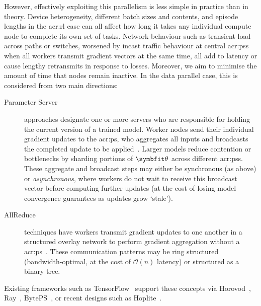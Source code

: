However, effectively exploiting this parallelism is less simple in practice than in theory.
Device heterogeneity, different batch sizes and contents, and episode lengths in the \gls{acr:rl} case can all affect how long it takes any individual compute node to complete its own set of tasks.
Network behaviour such as transient load across paths or switches, worsened by incast traffic behaviour at central \glspl{acr:ps} when all workers transmit gradient vectors at the same time, all add to latency or cause lengthy retransmits in response to losses.
Moreover, we aim to minimise the amount of time that nodes remain inactive.
In the data parallel case, this is considered from two main directions:
\begin{description}
	\item[Parameter Server] approaches designate one or more servers who are responsible for holding the current version of a trained model.
	Worker nodes send their individual gradient updates to the \gls{acr:ps}, who aggregates all inputs and broadcasts the completed update to be applied~\parencite{DBLP:conf/nips/DeanCMCDLMRSTYN12,DBLP:conf/osdi/LiAPSAJLSS14}.
	Larger models reduce contention or bottlenecks by sharding portions of $\wvec{}$ across different \glspl{acr:ps}.
	These aggregate and broadcast steps may either be synchronous (as above) or \emph{asynchronous}, where workers do not wait to receive this broadcast vector before computing further updates (at the cost of losing model convergence guarantees as updates grow `stale').
	
	\item[AllReduce] techniques have workers transmit gradient updates to one another in a structured overlay network to perform gradient aggregation without a \gls{acr:ps}~\parencite{DBLP:conf/cluster/MamidalaLP04,DBLP:conf/ipps/PatarasukY07}.
	These communication patterns may be ring structured (bandwidth-optimal, at the cost of $\mathcal{O}{\left(n\right)}$ latency) or structured as a binary tree.
\end{description}
Existing frameworks such as TensorFlow~\parencite{DBLP:journals/corr/AbadiABBCCCDDDG16} support these concepts via Horovod~\parencite{DBLP:journals/corr/abs-1802-05799}, Ray~\parencite{DBLP:conf/osdi/MoritzNWTLLEYPJ18}, BytePS~\parencite{DBLP:conf/osdi/JiangZLYCG20}, or recent designs such as Hoplite~\parencite{DBLP:conf/sigcomm/ZhuangLZWLNMS21}.


